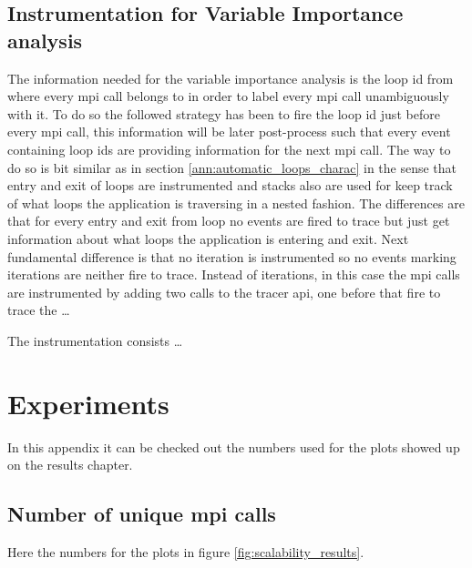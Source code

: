 \section{Instrumentation for Variable Importance analysis}

The information needed for the variable importance analysis is the loop id from where
every mpi call belongs to in order to label every mpi call unambiguously with
it. To do so the followed strategy has been to fire the loop id
just before every mpi call, this information will be later post-process such
that every event containing loop ids are providing information for the next mpi
call. The way to do so is bit similar as in section
\ref{ann:automatic_loops_charac} in the sense that entry and exit of loops are
instrumented and stacks also are used for keep
track of what loops the application is traversing in a nested fashion. The
differences are that for every entry and exit from loop no events are fired to
trace but just get information about what loops the application is entering and
exit. Next fundamental difference is that no iteration is instrumented so no
events marking iterations are neither fire to trace. Instead of iterations, in
this case the mpi calls are instrumented by adding two calls to the tracer api,
one before that fire to trace the \ldots

The instrumentation consists \ldots

\chapter{Experiments}

In this appendix it can be checked out the numbers used for the plots showed up
on the results chapter.

\section{Number of unique mpi calls}\label{s:nunique_mpi_calls}

Here the numbers for the plots in figure \ref{fig:scalability_results}.

